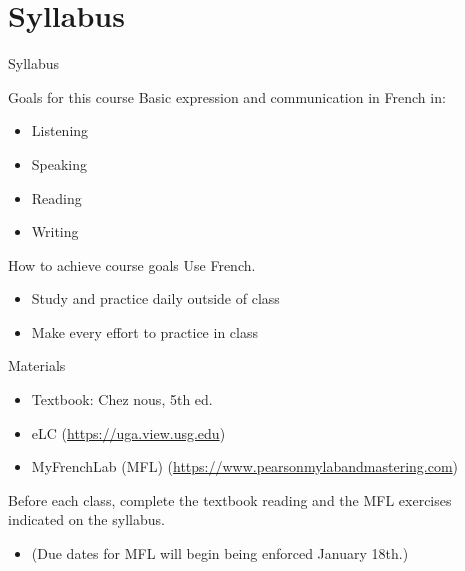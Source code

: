 \documentclass{beamer}
\begin{document}
  \section{Syllabus}
  \begin{frame}
    \begin{center}
      \Huge{Syllabus}
    \end{center}
  \end{frame}

  \begin{frame}{Goals for this course}
    Basic expression and communication in French in:
    \begin{itemize}
      \item Listening
      \item Speaking
      \item Reading
      \item Writing
    \end{itemize}
  \end{frame}

  \begin{frame}{How to achieve course goals}
    Use French.
    \begin{itemize}
      \item Study and practice \alert{daily} outside of class
      \item Make every effort to practice in class
    \end{itemize}
  \end{frame}

  \begin{frame}{Materials}
    \begin{itemize}
      \item Textbook: Chez nous, 5th ed.
      \item eLC (\url{https://uga.view.usg.edu})
      \item MyFrenchLab (MFL) (\url{https://www.pearsonmylabandmastering.com})
    \end{itemize}
    \alert{Before each class}, complete the textbook reading and the MFL exercises indicated on the syllabus.
    \begin{itemize}
      \item (Due dates for MFL will begin being enforced January 18th.)
    \end{itemize}
  \end{frame}
\end{document}

